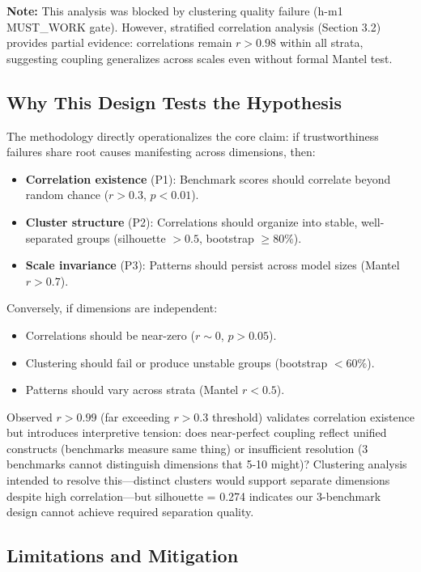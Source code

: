 \textbf{Note:} This analysis was blocked by clustering quality failure (h-m1 MUST\_WORK gate). However, stratified correlation analysis (Section 3.2) provides partial evidence: correlations remain $r > 0.98$ within all strata, suggesting coupling generalizes across scales even without formal Mantel test.

\subsection{Why This Design Tests the Hypothesis}

The methodology directly operationalizes the core claim: if trustworthiness failures share root causes manifesting across dimensions, then:
\begin{itemize}
\item \textbf{Correlation existence} (P1): Benchmark scores should correlate beyond random chance ($r > 0.3$, $p < 0.01$).
\item \textbf{Cluster structure} (P2): Correlations should organize into stable, well-separated groups (silhouette $> 0.5$, bootstrap $\geq 80\%$).
\item \textbf{Scale invariance} (P3): Patterns should persist across model sizes (Mantel $r > 0.7$).
\end{itemize}

Conversely, if dimensions are independent:
\begin{itemize}
\item Correlations should be near-zero ($r \sim 0$, $p > 0.05$).
\item Clustering should fail or produce unstable groups (bootstrap $< 60\%$).
\item Patterns should vary across strata (Mantel $r < 0.5$).
\end{itemize}

Observed $r > 0.99$ (far exceeding $r > 0.3$ threshold) validates correlation existence but introduces interpretive tension: does near-perfect coupling reflect unified constructs (benchmarks measure same thing) or insufficient resolution (3 benchmarks cannot distinguish dimensions that 5-10 might)? Clustering analysis intended to resolve this---distinct clusters would support separate dimensions despite high correlation---but silhouette = 0.274 indicates our 3-benchmark design cannot achieve required separation quality.

\subsection{Limitations and Mitigation}

